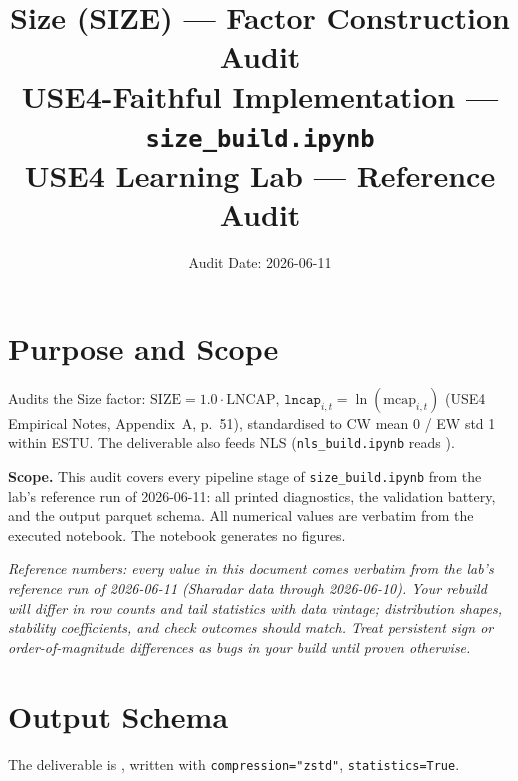 \documentclass[11pt,a4paper]{article}
\title{\textbf{Size (SIZE) --- Factor Construction Audit}\\[2pt]
\large USE4-Faithful Implementation --- \texttt{size\_build.ipynb}\\[4pt]
\normalsize USE4 Learning Lab --- Reference Audit}
\author{Audit Date: 2026-06-11}
\date{}
\newcommand{\NOTE}[1]{\textcolor{note}{\textit{#1}}}
\begin{document}
\maketitle
\tableofcontents
\newpage

\section{Purpose and Scope}

Audits the Size factor: $\mathrm{SIZE} = 1.0 \cdot \mathrm{LNCAP}$,
$\texttt{lncap}_{i,t} = \ln(\text{mcap}_{i,t})$ (USE4 Empirical Notes, Appendix~A,
p.~51), standardised to CW mean 0 / EW std 1 within ESTU. The deliverable also
feeds NLS (\texttt{nls\_build.ipynb} reads ).

\smallskip
\textbf{Scope.} This audit covers every pipeline stage of
\texttt{size\_build.ipynb} from the lab's reference run of 2026-06-11: all printed diagnostics, the
validation battery, and the output parquet schema. All numerical values are
verbatim from the executed notebook. The notebook generates no figures.

\NOTE{Reference numbers: every value in this document comes verbatim from the lab's reference run of 2026-06-11 (Sharadar data through 2026-06-10). Your rebuild will differ in row counts and tail statistics with data vintage; distribution shapes, stability coefficients, and check outcomes should match. Treat persistent sign or order-of-magnitude differences as bugs in your build until proven otherwise.}


\section{Output Schema}

The deliverable is , written with
\texttt{compression="zstd"}, \newline\texttt{statistics=True}.
\end{document}

